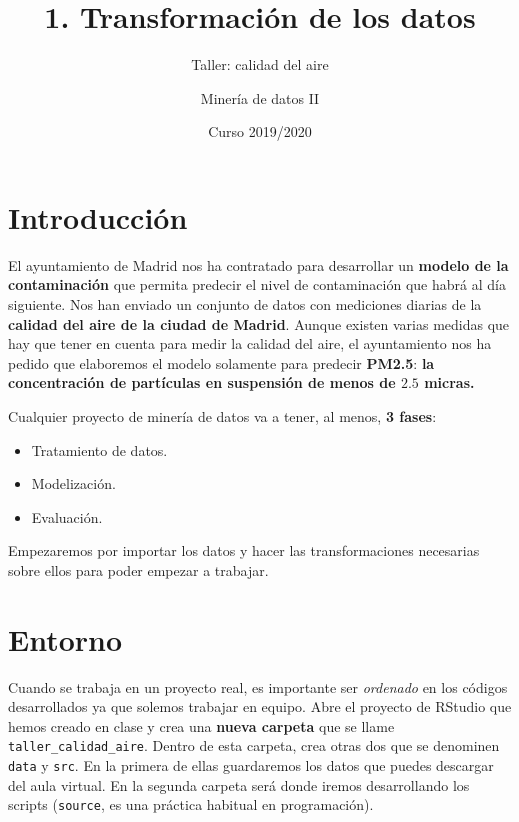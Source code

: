 \documentclass[]{article}
\title{1. Transformación de los datos}
\subtitle{Taller: calidad del aire}
\author{Minería de datos II}
\date{Curso 2019/2020}
\providecommand{\tightlist}{%
  \setlength{\itemsep}{0pt}\setlength{\parskip}{0pt}}
\begin{document}
\maketitle

{
\setcounter{tocdepth}{2}
\tableofcontents
}
\hypertarget{introduccion}{%
\section{Introducción}\label{introduccion}}

El ayuntamiento de Madrid nos ha contratado para desarrollar un
\textbf{modelo de la contaminación} que permita predecir el nivel de
contaminación que habrá al día siguiente. Nos han enviado un conjunto de
datos con mediciones diarias de la \textbf{calidad del aire de la ciudad
de Madrid}. Aunque existen varias medidas que hay que tener en cuenta
para medir la calidad del aire, el ayuntamiento nos ha pedido que
elaboremos el modelo solamente para predecir \textbf{PM2.5}: \textbf{la
concentración de partículas en suspensión de menos de \(2.5\) micras.}

Cualquier proyecto de minería de datos va a tener, al menos, \textbf{3
fases}:

\begin{itemize}
\tightlist
\item
  Tratamiento de datos.
\item
  Modelización.
\item
  Evaluación.
\end{itemize}

Empezaremos por importar los datos y hacer las transformaciones
necesarias sobre ellos para poder empezar a trabajar.

\hypertarget{entorno}{%
\section{Entorno}\label{entorno}}

Cuando se trabaja en un proyecto real, es importante ser \emph{ordenado}
en los códigos desarrollados ya que solemos trabajar en equipo. Abre el
proyecto de RStudio que hemos creado en clase y crea una \textbf{nueva
carpeta} que se llame \texttt{taller\_calidad\_aire}. Dentro de esta
carpeta, crea otras dos que se denominen \texttt{data} y \texttt{src}.
En la primera de ellas guardaremos los datos que puedes descargar del
aula virtual. En la segunda carpeta será donde iremos desarrollando los
scripts (\texttt{source}, es una práctica habitual en programación).
\end{document}
